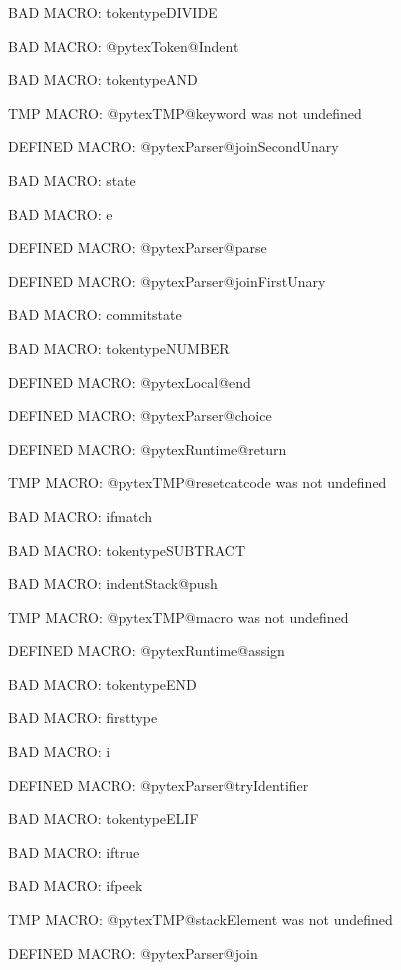BAD MACRO: tokentypeDIVIDE

BAD MACRO: @pytexToken@Indent

BAD MACRO: tokentypeAND

\ifx\@pytexTMP@keyword\undefined\else TMP MACRO: @pytexTMP@keyword was not undefined
\fi

\ifx\@pytexParser@joinSecondUnary\undefined\else DEFINED MACRO: @pytexParser@joinSecondUnary
\fi

BAD MACRO: state

BAD MACRO: e

\ifx\@pytexParser@parse\undefined\else DEFINED MACRO: @pytexParser@parse
\fi

\ifx\@pytexParser@joinFirstUnary\undefined\else DEFINED MACRO: @pytexParser@joinFirstUnary
\fi

BAD MACRO: commitstate

BAD MACRO: tokentypeNUMBER

\ifx\@pytexLocal@end\undefined\else DEFINED MACRO: @pytexLocal@end
\fi

\ifx\@pytexParser@choice\undefined\else DEFINED MACRO: @pytexParser@choice
\fi

\ifx\@pytexRuntime@return\undefined\else DEFINED MACRO: @pytexRuntime@return
\fi

\ifx\@pytexTMP@resetcatcode\undefined\else TMP MACRO: @pytexTMP@resetcatcode was not undefined
\fi

BAD MACRO: ifmatch

BAD MACRO: tokentypeSUBTRACT

BAD MACRO: indentStack@push

\ifx\@pytexTMP@macro\undefined\else TMP MACRO: @pytexTMP@macro was not undefined
\fi

\ifx\@pytexRuntime@assign\undefined\else DEFINED MACRO: @pytexRuntime@assign
\fi

BAD MACRO: tokentypeEND

BAD MACRO: firsttype

BAD MACRO: i

\ifx\@pytexParser@tryIdentifier\undefined\else DEFINED MACRO: @pytexParser@tryIdentifier
\fi

BAD MACRO: tokentypeELIF

BAD MACRO: iftrue

BAD MACRO: ifpeek

\ifx\@pytexTMP@stackElement\undefined\else TMP MACRO: @pytexTMP@stackElement was not undefined
\fi

\ifx\@pytexParser@join\undefined\else DEFINED MACRO: @pytexParser@join
\fi

